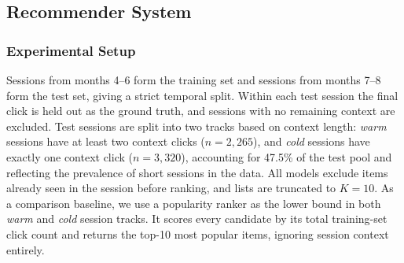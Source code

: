\documentclass[a4paper,oneside,12pt]{book}
\begin{document}





\subsection{Recommender System}

\subsubsection{Experimental Setup}

Sessions from months 4--6 form the training set and sessions from months
7--8 form the test set, giving a strict temporal split.
Within each test session the final click is held out as the ground truth, and sessions with no remaining context are excluded.
Test sessions are split into two tracks based on context length: \textit{warm}
sessions have at least two context clicks ($n = 2{,}265$), and \textit{cold}
sessions have exactly one context click ($n = 3{,}320$), accounting for
47.5\% of the test pool and reflecting the prevalence of short sessions in
the data. All models exclude items already seen in the session before ranking, and
lists are truncated to $K = 10$. As a comparison baseline, we use a popularity ranker as the lower bound in both \textit{warm} and \textit{cold} session tracks. It scores every candidate by its total training-set click count and returns the top-10 most popular items, ignoring session context entirely.
\end{document}
